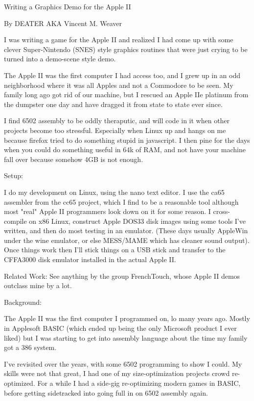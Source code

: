 Writing a Graphics Demo for the Apple II

By DEATER
AKA Vincent M. Weaver

I was writing a game for the Apple II and realized I had come up with
some clever Super-Nintendo (SNES) style graphics routines that were just
crying to be turned into a demo-scene style demo.

The Apple II was the first computer I had access too, and I grew up in an odd
neighborhood where it was all Apples and not a Commodore to be seen.
My family long ago got rid of our machine, but I rescued an Apple IIe platinum
from the dumpster one day and have dragged it from state to state ever since.

I find 6502 assembly to be oddly theraputic, and will code in it when other
projects become too stressful.  Especially when Linux up and hangs on me
because firefox tried to do something stupid in javascript.  I then pine for
the days when you could do something useful in 64k of RAM, and not have your
machine fall over because somehow 4GB is not enough.

Setup:

I do my development on Linux, using the nano text editor.  I use the
ca65 assembler from the cc65 project, which I find to be a reasonable
tool although most "real" Apple II programmers look down on it for some
reason.
I cross-compile on x86 Linux, construct Apple DOS33 disk images using
some tools I've written, and then do most testing in an emulator.
(These days usually AppleWin under the wine emulator, or else MESS/MAME
which has cleaner sound output).  Once things work then I'll stick things
on a USB stick and transfer to the CFFA3000 disk emulator installed in
the actual Apple II.

Related Work:
See anything by the group FrenchTouch, whose Apple II demos outclass
mine by a lot.


Background:

The Apple II was the first computer I programmed on, lo many years ago.
Mostly in Applesoft BASIC (which ended up being the only Microsoft product
I ever liked) but I was starting to get into assembly language about the
time my family got a 386 system.

I've revisited over the years, with some 6502 programming to show I could.
My skills were not that great, I had one of my size-optimization projects
crowd re-optimized.  For a while I had a side-gig re-optimizing modern games
in BASIC, before getting sidetracked into going full in on 6502 assembly
again.


